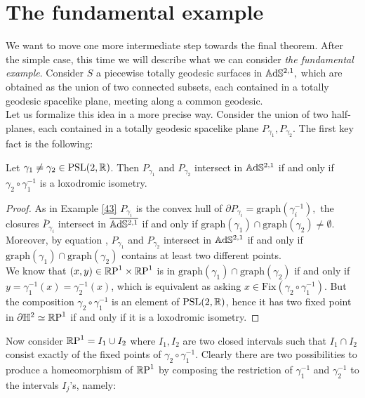     \section{The fundamental example} We want to move one more intermediate step towards the final theorem. After the simple case, this time we will describe what we can consider \textit{the fundamental example}. Consider $S$ a piecewise totally geodesic surfaces in $\A^{2,1},$ which are obtained as the union of two connected subsets, each contained in a totally geodesic spacelike plane, meeting along a common geodesic. \\
Let us formalize this idea in a more precise way. Consider the union of two half-planes, each contained in a totally geodesic spacelike plane $P_{\gamma_1},P_{\gamma_2}$. The first key fact is the following:

\begin{lemma}\label{Mati}
    Let $\gamma_1\neq\gamma_2\in\PSL$. Then $P_{\gamma_1}$ and $P_{\gamma_2}$ intersect in $\A^{2,1}$ if and only if $\gamma_2\circ{\gamma_1^{-1}}$ is a loxodromic isometry. 
\end{lemma}
\begin{proof}
    As in Example \ref{43} $P_{\gamma_i}$ is the convex hull of $\partial P_{\gamma_i}=\text{graph}(\gamma_i^{-1}),$ the closures $\overline{P}_{\gamma_i}$  intersect in $\overline{\A^{2,1}}$ if and only if $\text{graph}(\gamma_1)\cap\text{graph}(\gamma_2)\neq\emptyset$. Moreover, by equation , $P_{\gamma_1}$ and $P_{\gamma_2}$ intersect in $\A^{2,1}$ if and only if $\text{graph}(\gamma_1)\cap\text{graph}(\gamma_2)$ contains at least two different points. \\
    We know that $(x,y)\in\T$ is in $\text{graph}(\gamma_1)\cap\text{graph}(\gamma_2)$ if and only if $y=\gamma_1^{-1}(x)=\gamma_2^{-1}(x)$, which is equivalent as asking $x\in\text{Fix}(\gamma_2\circ\gamma_1^{-1})$. But the composition $\gamma_2\circ\gamma_1^{-1}$ is an element of $\PSL$, hence it has two fixed point in $\partial\H^2\simeq\S$ if and only if it is a loxodromic isometry.
\end{proof}

Now consider $\S=I_1\cup I_2$ where $I_1,I_2$ are two closed intervals such that $I_1\cap I_2$ consist exactly of the fixed points of $\gamma_2\circ\gamma_1^{-1}.$ Clearly there are two possibilities to produce a homeomorphism of $\S$ by composing the restriction of $\gamma_1^{-1}$ and $\gamma_2^{-1}$ to the intervals $I_j$'s, namely: 

